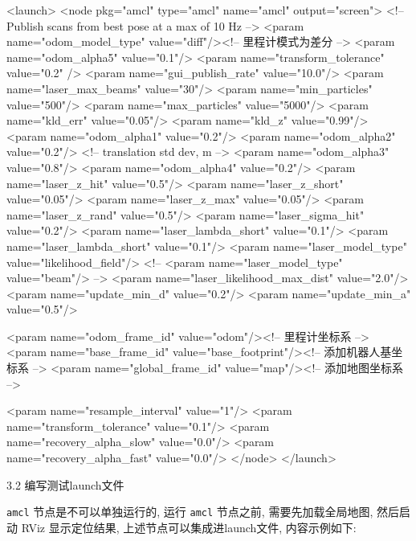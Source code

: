 \documentclass[openany, fontset=windowsold]{ctexbook}
\theoremstyle{kaiti}
\theoremstyle{normal}
\begin{document}
\begin{xml}
  <launch>
  <node pkg="amcl" type="amcl" name="amcl" output="screen">
    <!-- Publish scans from best pose at a max of 10 Hz -->
    <param name="odom_model_type" value="diff"/><!-- 里程计模式为差分 -->
    <param name="odom_alpha5" value="0.1"/>
    <param name="transform_tolerance" value="0.2" />
    <param name="gui_publish_rate" value="10.0"/>
    <param name="laser_max_beams" value="30"/>
    <param name="min_particles" value="500"/>
    <param name="max_particles" value="5000"/>
    <param name="kld_err" value="0.05"/>
    <param name="kld_z" value="0.99"/>
    <param name="odom_alpha1" value="0.2"/>
    <param name="odom_alpha2" value="0.2"/>
    <!-- translation std dev, m -->
    <param name="odom_alpha3" value="0.8"/>
    <param name="odom_alpha4" value="0.2"/>
    <param name="laser_z_hit" value="0.5"/>
    <param name="laser_z_short" value="0.05"/>
    <param name="laser_z_max" value="0.05"/>
    <param name="laser_z_rand" value="0.5"/>
    <param name="laser_sigma_hit" value="0.2"/>
    <param name="laser_lambda_short" value="0.1"/>
    <param name="laser_lambda_short" value="0.1"/>
    <param name="laser_model_type" value="likelihood_field"/>
    <!-- <param name="laser_model_type" value="beam"/> -->
    <param name="laser_likelihood_max_dist" value="2.0"/>
    <param name="update_min_d" value="0.2"/>
    <param name="update_min_a" value="0.5"/>

    <param name="odom_frame_id" value="odom"/><!-- 里程计坐标系 -->
    <param name="base_frame_id" value="base_footprint"/><!-- 添加机器人基坐标系 -->
    <param name="global_frame_id" value="map"/><!-- 添加地图坐标系 -->

    <param name="resample_interval" value="1"/>
    <param name="transform_tolerance" value="0.1"/>
    <param name="recovery_alpha_slow" value="0.0"/>
    <param name="recovery_alpha_fast" value="0.0"/>
  </node>
  </launch>
\end{xml}

3.2 编写测试launch文件

\verb|amcl| 节点是不可以单独运行的, 运行 \verb|amcl| 节点之前, 需要先加载全局地图, 然后启动 RViz 显示定位结果, 上述节点可以集成进launch文件, 内容示例如下:

\end{document}
